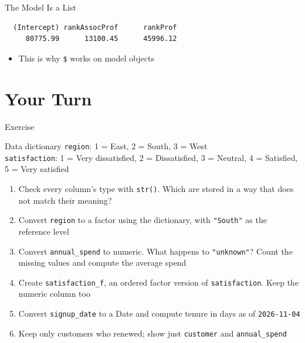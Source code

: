 \documentclass[
  ignorenonframetext,
  aspectratio=169,
]{beamer}
\providecommand{\tightlist}{%
  \setlength{\itemsep}{0pt}\setlength{\parskip}{0pt}}\usepackage{longtable,booktabs,array}
\begin{document}
\begin{frame}[fragile]{The Model Is a List}
\begingroup\tiny\color{darkgray}

\begin{verbatim}
  (Intercept) rankAssocProf      rankProf 
     80775.99      13100.45      45996.12 
\end{verbatim}

\endgroup

\begin{itemize}
\tightlist
\item
  This is why \texttt{\$} works on model objects
\end{itemize}
\end{frame}

\hypertarget{sec-your-turn}{%
\section{Your Turn}\label{sec-your-turn}}

\begin{frame}[fragile]{Exercise}
\protect\hypertarget{exercise}{}
\begin{exampleblock}{Data dictionary}
\protect\hypertarget{data-dictionary}{}
\texttt{region}: 1 = East, 2 = South, 3 = West\\
\texttt{satisfaction}: 1 = Very dissatisfied, 2 = Dissatisfied, 3 =
Neutral, 4 = Satisfied, 5 = Very satisfied

\begin{enumerate}
\tightlist
\item
  Check every column's type with \texttt{str()}. Which are stored in a
  way that does not match their meaning?
\item
  Convert \texttt{region} to a factor using the dictionary, with
  \texttt{"South"} as the reference level
\item
  Convert \texttt{annual\_spend} to numeric. What happens to
  \texttt{"unknown"}? Count the missing values and compute the average
  spend
\item
  Create \texttt{satisfaction\_f}, an ordered factor version of
  \texttt{satisfaction}. Keep the numeric column too
\item
  Convert \texttt{signup\_date} to a Date and compute tenure in days as
  of \texttt{2026-11-04}
\item
  Keep only customers who renewed; show just \texttt{customer} and
  \texttt{annual\_spend}
\end{enumerate}
\end{exampleblock}
\end{frame}
\end{document}

